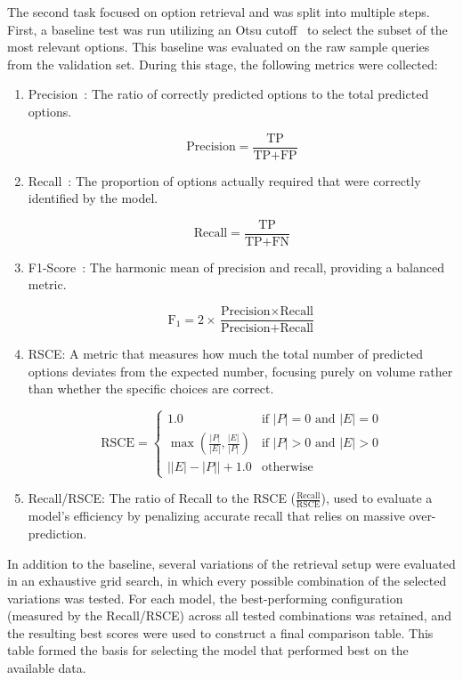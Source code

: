 The second task focused on option retrieval and was split into multiple steps. First, a baseline test was run utilizing an Otsu cutoff~\cite{otsu1979threshold} to select the subset of the most relevant options. This baseline was evaluated on the raw sample queries from the validation set. During this stage, the following metrics were collected:

\begin{enumerate}
    \item Precision~\cite{manning2008introduction}: The ratio of correctly predicted options to the total predicted options. 
    
    $$\text{Precision} = \frac{\text{TP}}{\text{TP} + \text{FP}}$$
    
    \item Recall~\cite{manning2008introduction}: The proportion of options actually required that were correctly identified by the model. 
    
    $$\text{Recall} = \frac{\text{TP}}{\text{TP} + \text{FN}}$$
    
    \item F1-Score~\cite{manning2008introduction}: The harmonic mean of precision and recall, providing a balanced metric.
    
    $$\text{F}_1 = 2 \times \frac{\text{Precision} \times \text{Recall}}{\text{Precision} + \text{Recall}}$$
    
    \item \ac{RSCE}: A metric that measures how much the total number of predicted options deviates from the expected number, focusing purely on volume rather than whether the specific choices are correct.
    
        $$\text{RSCE} = \begin{cases}
           1.0 & \text{if } |P| = 0 \text{ and } |E| = 0 \\
           \max\left(\frac{|P|}{|E|}, \frac{|E|}{|P|}\right) & \text{if } |P| > 0 \text{ and } |E| > 0 \\
           \big||E| - |P|\big| + 1.0 & \text{otherwise}
        \end{cases}$$
    
    \item Recall/\ac{RSCE}: The ratio of Recall to the \ac{RSCE} ($\frac{\text{Recall}}{\text{RSCE}}$), used to evaluate a model's efficiency by penalizing accurate recall that relies on massive over-prediction.
\end{enumerate}

In addition to the baseline, several variations of the retrieval setup were evaluated in an exhaustive grid search, in which every possible combination of the selected variations was tested. For each model, the best-performing configuration (measured by the Recall/\ac{RSCE}) across all tested combinations was retained, and the resulting best scores were used to construct a final comparison table. This table formed the basis for selecting the model that performed best on the available data.

